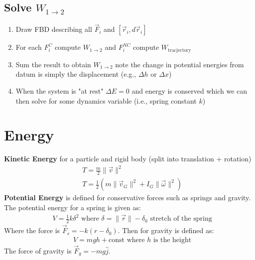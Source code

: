 \documentclass[conference]{IEEEtran}
\begin{document}
\subsection{Solve $W_{1 \to 2}$}
\begin{enumerate}
    \item Draw FBD describing all $\vec{F}_i$ and $[\vec{r}_i, d\vec{r}_i]$
    \item For each $F_i^C$ compute $W_{1\to2}$ and $F_i^{NC}$ compute $W_{\text{tracjectory}}$
    \item Sum the result to obtain $W_{1 \to 2}$ note the change in potential energies from datum is simply the displacement (e.g., $\Delta h$ or $\Delta x$)
    \item When the system is "at rest" $\Delta E = 0$ and energy is conserved which we can then solve for some dynamics variable (i.e., spring constant $k$)
\end{enumerate}
\section{Energy}
\textbf{Kinetic Energy} for a particle and rigid body (split into translation + rotation)
\begin{align}
    & T = \frac{m}{2}\|\vec{v}\|^2 \\
    & T = \frac{1}{2}(m\|\vec{v}_G\|^2 + I_G\|\vec{\omega}\|^2)
\end{align}
\textbf{Potential Energy} is defined for conservative forces such as springs and gravity. The potential energy for a spring is given as:
\begin{align}
    & V = \frac{1}{2}k\delta^2 \text{ where } \delta = \|\vec{r}\| - \delta_0 \text{ stretch of the spring}
\end{align}
Where the force is $\vec{F}_s = -k (r - \delta_0)$. Then for gravity is defined as:
\begin{align}
    & V = m g h + \text{const} \text{ where $h$ is the height}
\end{align}
The force of gravity is $\vec{F}_g = -mg\hat{j}$.
\end{document}
